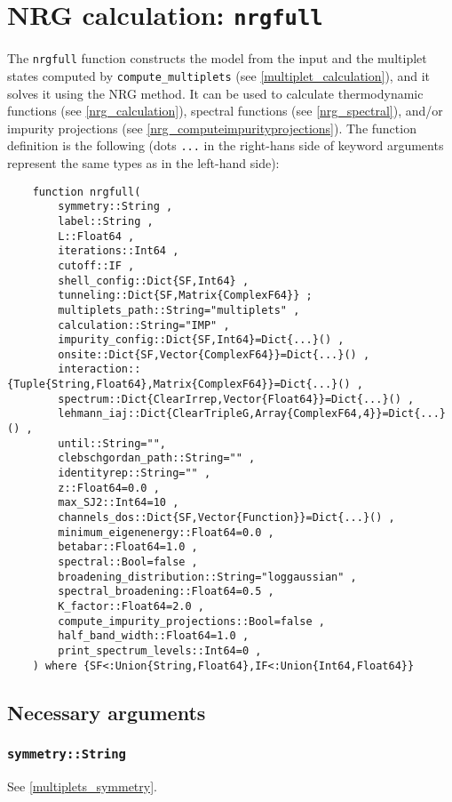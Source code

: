\documentclass[notitlepage]{article}
\begin{document}
\section{NRG calculation: \texttt{nrgfull}}\label{nrg}
The \texttt{nrgfull} function constructs the model from the
input and the multiplet states computed by
\texttt{compute\_multiplets} (see
\ref{multiplet_calculation}), and it solves it using the NRG
method. It can be used to calculate thermodynamic functions
(see \ref{nrg_calculation}), spectral functions (see
\ref{nrg_spectral}), and/or impurity projections (see
\ref{nrg_computeimpurityprojections}). The function
definition is the following (dots \texttt{...} in the
right-hans side of keyword arguments represent the same
types as in the left-hand side):
\begin{verbatim}
    function nrgfull(
        symmetry::String ,
        label::String ,
        L::Float64 ,
        iterations::Int64 ,
        cutoff::IF ,
        shell_config::Dict{SF,Int64} ,
        tunneling::Dict{SF,Matrix{ComplexF64}} ;
        multiplets_path::String="multiplets" ,
        calculation::String="IMP" ,
        impurity_config::Dict{SF,Int64}=Dict{...}() ,
        onsite::Dict{SF,Vector{ComplexF64}}=Dict{...}() ,
        interaction::{Tuple{String,Float64},Matrix{ComplexF64}}=Dict{...}() ,
        spectrum::Dict{ClearIrrep,Vector{Float64}}=Dict{...}() ,
        lehmann_iaj::Dict{ClearTripleG,Array{ComplexF64,4}}=Dict{...}() ,
        until::String="",
        clebschgordan_path::String="" ,
        identityrep::String="" ,
        z::Float64=0.0 ,
        max_SJ2::Int64=10 ,
        channels_dos::Dict{SF,Vector{Function}}=Dict{...}() ,
        minimum_eigenenergy::Float64=0.0 ,
        betabar::Float64=1.0 ,
        spectral::Bool=false ,
        broadening_distribution::String="loggaussian" ,
        spectral_broadening::Float64=0.5 ,
        K_factor::Float64=2.0 ,
        compute_impurity_projections::Bool=false ,
        half_band_width::Float64=1.0 ,
        print_spectrum_levels::Int64=0 ,
    ) where {SF<:Union{String,Float64},IF<:Union{Int64,Float64}}
\end{verbatim}

\subsection{Necessary arguments}
\subsubsection{\texttt{symmetry::String}}
\label{nrg_symmetry}
See \ref{multiplets_symmetry}.
\end{document}
